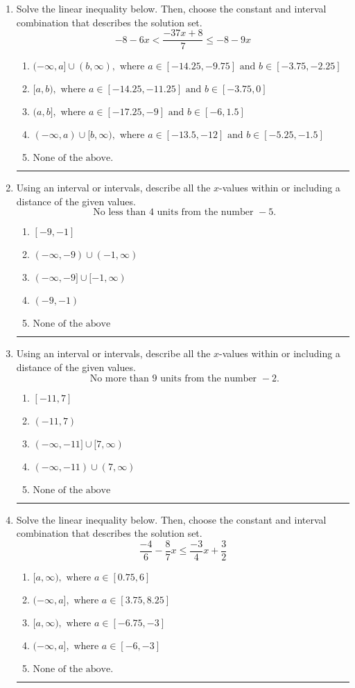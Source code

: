 \documentclass[14pt]{extbook}
\newcommand{\litem}[1]{\item#1\hspace*{-1cm}\rule{\textwidth}{0.4pt}}
\begin{document}
\begin{enumerate}
\litem{
Solve the linear inequality below. Then, choose the constant and interval combination that describes the solution set.\[ -8 - 6 x < \frac{-37 x + 8}{7} \leq -8 - 9 x \]\begin{enumerate}[label=\Alph*.]
\item \( (-\infty, a] \cup (b, \infty), \text{ where } a \in [-14.25, -9.75] \text{ and } b \in [-3.75, -2.25] \)
\item \( [a, b), \text{ where } a \in [-14.25, -11.25] \text{ and } b \in [-3.75, 0] \)
\item \( (a, b], \text{ where } a \in [-17.25, -9] \text{ and } b \in [-6, 1.5] \)
\item \( (-\infty, a) \cup [b, \infty), \text{ where } a \in [-13.5, -12] \text{ and } b \in [-5.25, -1.5] \)
\item \( \text{None of the above.} \)

\end{enumerate} }
\litem{
Using an interval or intervals, describe all the $x$-values within or including a distance of the given values.\[ \text{ No less than } 4 \text{ units from the number } -5. \]\begin{enumerate}[label=\Alph*.]
\item \( [-9, -1] \)
\item \( (-\infty, -9) \cup (-1, \infty) \)
\item \( (-\infty, -9] \cup [-1, \infty) \)
\item \( (-9, -1) \)
\item \( \text{None of the above} \)

\end{enumerate} }
\litem{
Using an interval or intervals, describe all the $x$-values within or including a distance of the given values.\[ \text{ No more than } 9 \text{ units from the number } -2. \]\begin{enumerate}[label=\Alph*.]
\item \( [-11, 7] \)
\item \( (-11, 7) \)
\item \( (-\infty, -11] \cup [7, \infty) \)
\item \( (-\infty, -11) \cup (7, \infty) \)
\item \( \text{None of the above} \)

\end{enumerate} }
\litem{
Solve the linear inequality below. Then, choose the constant and interval combination that describes the solution set.\[ \frac{-4}{6} - \frac{8}{7} x \leq \frac{-3}{4} x + \frac{3}{2} \]\begin{enumerate}[label=\Alph*.]
\item \( [a, \infty), \text{ where } a \in [0.75, 6] \)
\item \( (-\infty, a], \text{ where } a \in [3.75, 8.25] \)
\item \( [a, \infty), \text{ where } a \in [-6.75, -3] \)
\item \( (-\infty, a], \text{ where } a \in [-6, -3] \)
\item \( \text{None of the above}. \)


\end{enumerate}}
\end{enumerate}
\end{document}
